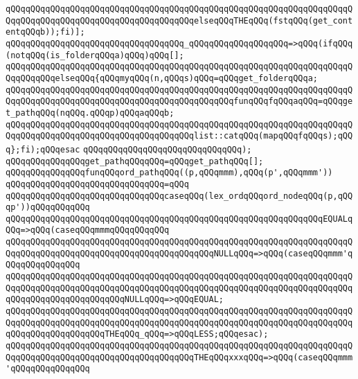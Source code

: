 \verb|qQQqqQQqqQQqqQQqqQQqqQQqqQQqqQQqqQQqqQQqqQQqqQQqqQQqqQQqqQQqqQQqqQQqqQQqqQQqqQQqqQQqqQQqqQQqqQQqqQQqqQQqqQQqelseqQQqTHEqQQq(fstqQQq(get_contentqQQqb));fi)];|\newline
\verb|qQQqqQQqqQQqqQQqqQQqqQQqqQQqqQQqqQQq_qQQqqQQqqQQqqQQqqQQq=>qQQq(ifqQQq(notqQQq(is_folderqQQqa)qQQq)qQQq[];|\newline
\verb|qQQqqQQqqQQqqQQqqQQqqQQqqQQqqQQqqQQqqQQqqQQqqQQqqQQqqQQqqQQqqQQqqQQqqQQqqQQqqQQqelseqQQq{qQQqmyqQQq(n,qQQqs)qQQq=qQQqget_folderqQQqa;|\newline
\verb|qQQqqQQqqQQqqQQqqQQqqQQqqQQqqQQqqQQqqQQqqQQqqQQqqQQqqQQqqQQqqQQqqQQqqQQqqQQqqQQqqQQqqQQqqQQqqQQqqQQqqQQqqQQqqQQqqQQqfunqQQqfqQQqaqQQq=qQQqget_pathqQQq(nqQQq.qQQqp)qQQqaqQQqb;|\newline
\verb|qQQqqQQqqQQqqQQqqQQqqQQqqQQqqQQqqQQqqQQqqQQqqQQqqQQqqQQqqQQqqQQqqQQqqQQqqQQqqQQqqQQqqQQqqQQqqQQqqQQqqQQqqQQqlist::catqQQq(mapqQQqfqQQqs);qQQq};fi);qQQqesac|\newline
\newline
\verb|qQQqqQQqqQQqqQQqqQQqqQQqqQQqqQQq);|\newline
\newline
\verb|qQQqqQQqqQQqqQQqget_pathqQQqqQQq=qQQqget_pathqQQq[];|\newline
\newline
\verb|qQQqqQQqqQQqqQQqfunqQQqord_pathqQQq((p,qQQqmmm),qQQq(p',qQQqmmm'))|\newline
\verb|qQQqqQQqqQQqqQQqqQQqqQQqqQQqqQQq=qQQq|\newline
\verb|qQQqqQQqqQQqqQQqqQQqqQQqqQQqqQQqcaseqQQq(lex_ordqQQqord_nodeqQQq(p,qQQqp'))qQQqqQQqqQQq|\newline
\verb|qQQqqQQqqQQqqQQqqQQqqQQqqQQqqQQqqQQqqQQqqQQqqQQqqQQqqQQqqQQqqQQqEQUALqQQq=>qQQq(caseqQQqmmmqQQqqQQqqQQq|\newline
\verb|qQQqqQQqqQQqqQQqqQQqqQQqqQQqqQQqqQQqqQQqqQQqqQQqqQQqqQQqqQQqqQQqqQQqqQQqqQQqqQQqqQQqqQQqqQQqqQQqqQQqqQQqqQQqqQQqNULLqQQq=>qQQq(caseqQQqmmm'qQQqqQQqqQQqqQQq|\newline
\verb|qQQqqQQqqQQqqQQqqQQqqQQqqQQqqQQqqQQqqQQqqQQqqQQqqQQqqQQqqQQqqQQqqQQqqQQqqQQqqQQqqQQqqQQqqQQqqQQqqQQqqQQqqQQqqQQqqQQqqQQqqQQqqQQqqQQqqQQqqQQqqQQqqQQqqQQqqQQqqQQqqQQqNULLqQQq=>qQQqEQUAL;|\newline
\verb|qQQqqQQqqQQqqQQqqQQqqQQqqQQqqQQqqQQqqQQqqQQqqQQqqQQqqQQqqQQqqQQqqQQqqQQqqQQqqQQqqQQqqQQqqQQqqQQqqQQqqQQqqQQqqQQqqQQqqQQqqQQqqQQqqQQqqQQqqQQqqQQqqQQqqQQqqQQqqQQqTHEqQQq_qQQq=>qQQqLESS;qQQqesac);|\newline
\verb|qQQqqQQqqQQqqQQqqQQqqQQqqQQqqQQqqQQqqQQqqQQqqQQqqQQqqQQqqQQqqQQqqQQqqQQqqQQqqQQqqQQqqQQqqQQqqQQqqQQqqQQqqQQqTHEqQQqxxxqQQq=>qQQq(caseqQQqmmm'qQQqqQQqqQQqqQQq|\newline
